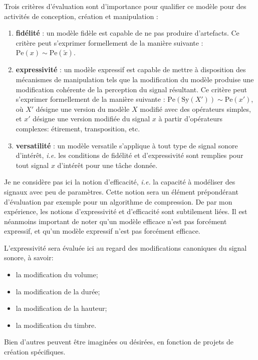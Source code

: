 Trois critères d'évaluation sont d'importance pour qualifier ce modèle pour des activités de conception, création et manipulation :
\begin{enumerate}
  \item\textbf{fidélité} : un modèle fidèle est capable de ne pas produire d'artefacts. Ce critère peut s'exprimer formellement de la manière suivante : $\mathrm{Pe}(x) \sim \mathrm{Pe}(\tilde{x})$.
  \item\textbf{expressivité} : un modèle expressif est capable de mettre à disposition des mécanismes de manipulation tels que la modification du modèle produise une modification cohérente de la perception du signal résultant. Ce critère peut s'exprimer formellement de la manière suivante : $\mathrm{Pe}(\mathrm{Sy}(X')) \sim \mathrm{Pe}(x')$, où $X'$ désigne une version du modèle $X$ modifié avec des opérateurs simples, et $x'$ désigne une version modifiée du signal $x$ à partir d'opérateurs complexes: étirement, transposition, etc.
  \item\textbf{versatilité} : un modèle versatile s'applique à tout type de signal sonore d'intérêt, \textit{i.e.} les conditions de fidélité et d'expressivité sont remplies pour tout signal $x$ d'intérêt pour une tâche donnée.
\end{enumerate}
Je ne considère pas ici la notion d'efficacité, \textit{i.e.} la capacité à modéliser des signaux avec peu de paramètres. Cette notion sera un élément prépondérant d'évaluation par exemple pour un algorithme de compression. De par mon expérience, les notions d'expressivité et d'efficacité sont subtilement liées. Il est néanmoins important de noter qu'un modèle efficace n'est pas forcément expressif, et qu'un modèle expressif n'est pas forcément efficace.

L'expressivité sera évaluée ici au regard des modifications canoniques du signal sonore, à savoir:
\begin{itemize}
  \item la modification du volume;
  \item la modification de la durée;
  \item la modification de la hauteur;
  \item la modification du timbre.
\end{itemize}
Bien d'autres peuvent être imaginées ou désirées, en fonction de projets de création spécifiques.

